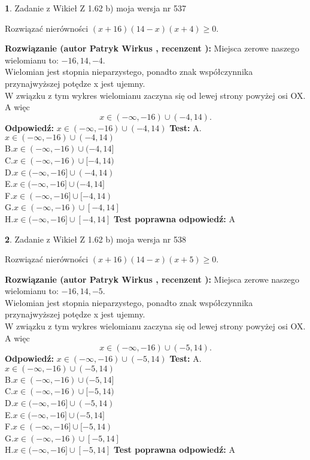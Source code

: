 \documentclass[12pt, a4paper]{article}
\theoremstyle{definition} %
\newtheorem{zad}{}
\newcommand{\zadStart}[1]{\begin{zad}#1\newline}
\newcommand{\zadStop}{\end{zad}}
\newcommand{\rozwStart}[2]{\noindent \textbf{Rozwiązanie (autor #1 , recenzent #2): }\newline}
\newcommand{\rozwStop}{\newline}
\newcommand{\odpStart}{\noindent \textbf{Odpowiedź:}\newline}
\newcommand{\odpStop}{\newline}
\newcommand{\testStart}{\noindent \textbf{Test:}\newline}
\newcommand{\testStop}{\newline}
\newcommand{\kluczStart}{\noindent \textbf{Test poprawna odpowiedź:}\newline}
\newcommand{\kluczStop}{\newline}
\begin{document}
\zadStart{Zadanie z Wikieł Z 1.62 b) moja wersja nr 537}

Rozwiązać nierówności $(x+16)(14-x)(x+4)\ge0$.
\zadStop
\rozwStart{Patryk Wirkus}{}
Miejsca zerowe naszego wielomianu to: $-16, 14, -4$.\\
Wielomian jest stopnia nieparzystego, ponadto znak współczynnika przy\linebreak najwyższej potędze x jest ujemny.\\ W związku z tym wykres wielomianu zaczyna się od lewej strony powyżej osi OX. A więc $$x \in (-\infty,-16) \cup (-4,14).$$
\rozwStop
\odpStart
$x \in (-\infty,-16) \cup (-4,14)$
\odpStop
\testStart
A.$x \in (-\infty,-16) \cup (-4,14)$\\
B.$x \in (-\infty,-16) \cup (-4,14]$\\
C.$x \in (-\infty,-16) \cup [-4,14)$\\
D.$x \in (-\infty,-16] \cup (-4,14)$\\
E.$x \in (-\infty,-16] \cup (-4,14]$\\
F.$x \in (-\infty,-16] \cup [-4,14)$\\
G.$x \in (-\infty,-16) \cup [-4,14]$\\
H.$x \in (-\infty,-16] \cup [-4,14]$
\testStop
\kluczStart
A
\kluczStop



\zadStart{Zadanie z Wikieł Z 1.62 b) moja wersja nr 538}

Rozwiązać nierówności $(x+16)(14-x)(x+5)\ge0$.
\zadStop
\rozwStart{Patryk Wirkus}{}
Miejsca zerowe naszego wielomianu to: $-16, 14, -5$.\\
Wielomian jest stopnia nieparzystego, ponadto znak współczynnika przy\linebreak najwyższej potędze x jest ujemny.\\ W związku z tym wykres wielomianu zaczyna się od lewej strony powyżej osi OX. A więc $$x \in (-\infty,-16) \cup (-5,14).$$
\rozwStop
\odpStart
$x \in (-\infty,-16) \cup (-5,14)$
\odpStop
\testStart
A.$x \in (-\infty,-16) \cup (-5,14)$\\
B.$x \in (-\infty,-16) \cup (-5,14]$\\
C.$x \in (-\infty,-16) \cup [-5,14)$\\
D.$x \in (-\infty,-16] \cup (-5,14)$\\
E.$x \in (-\infty,-16] \cup (-5,14]$\\
F.$x \in (-\infty,-16] \cup [-5,14)$\\
G.$x \in (-\infty,-16) \cup [-5,14]$\\
H.$x \in (-\infty,-16] \cup [-5,14]$
\testStop
\kluczStart
A
\kluczStop
\end{document}
